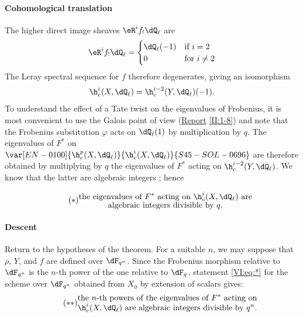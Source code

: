 \paragraph{Cohomological translation}
The higher direct image sheaves $\eR^i f_!\dQ_\ell$ are 
\[
  \eR^i f_!\dQ_\ell = \begin{cases}
                       \dQ_\ell(-1) & \text{if $i = 2$} \\
                       0            & \text{for $i\ne 2$}
                     \end{cases}
\]
The Leray spectral sequence for $f$ therefore degenerates, giving an isomorphism 
\[
  \h_c^i(X,\dQ_\ell) = \h_c^{i-2}(Y,\dQ_\ell)(-1) \text{.}
\]
To understand the effect of a Tate twist on the eigenvalues of 
Frobenius, it is most convenient to use the Galois point of view 
(\hyperref[II]{Report} \ref{II:1-8}) and note that the Frobenius substitution 
$\varphi$ acts on $\dQ_\ell(1)$ by multiplication by $q$. The 
eigenvalues of $F^\ast$ on $\var[EN-0100]{\h_c^p(X,\dQ_\ell)}{\h_c^i(X,\dQ_\ell)}{S45-SOL-0696}$ are therefore obtained by 
multiplying by $q$ the eigenvalues of $F^\ast$ acting on $\h_c^{i-2}(Y,\dQ_\ell)$. We 
know that the latter are algebraic integers ; hence 

\begin{equation*}\tag{$*$}\label{VI:eq:*}
  \substack{\displaystyle\text{the eigenvalues of $F^\ast$ acting on $\h_c^i(X,\dQ_\ell)$ are} \\
  \displaystyle\text{algebraic integers divisible by $q$.}}
\end{equation*}


\paragraph{Descent}
Return to the hypotheses of the theorem. For a suitable $n$, we may 
suppose that $\rho$, $Y$, and $f$ are defined over $\dF_{q^n}$. Since the 
Frobenius morphism relative to $\dF_{q^n}$ is the $n$-th power of the one 
relative to $\dF_q$, statement \eqref{VI:eq:*} for the scheme over 
$\dF_{q^n}$ obtained from $X_0$ by extension of scalars gives: 
\begin{equation*}\tag{$**$}\label{VI:eq:**}
  \substack{\displaystyle\text{the $n$-th powers of the eigenvalues of $F^\ast$ acting on} \\ \displaystyle\text{$\h_c^i(X,\dQ_\ell)$ are algebraic integers divisible by $q^n$.}}
\end{equation*}

